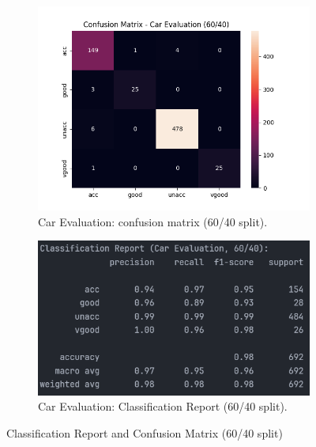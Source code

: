 \begin{figure}[H]
	\centering
	\begin{subfigure}{0.45\textwidth}
		\centering
		\includegraphics[width=\textwidth]{imgs/confusion_mat/confusion_mat__car_evaluation__60_vs_40.png}
		\caption{Car Evaluation: confusion matrix (60/40 split).}\label{fig:ce-cm-60-40}
	\end{subfigure}
	\hfill
	\begin{subfigure}{0.45\textwidth}
		\centering
		\includegraphics[width=\textwidth]{imgs/confusion_mat/class_rp__car_evaluation__60_vs_40.png}
		\caption{Car Evaluation: Classification Report (60/40 split).}\label{fig:ce-cr-60-40}
	\end{subfigure}

	\caption{Classification Report and Confusion Matrix (60/40 split)}\label{fig:ce-eval-60-40}
\end{figure}
